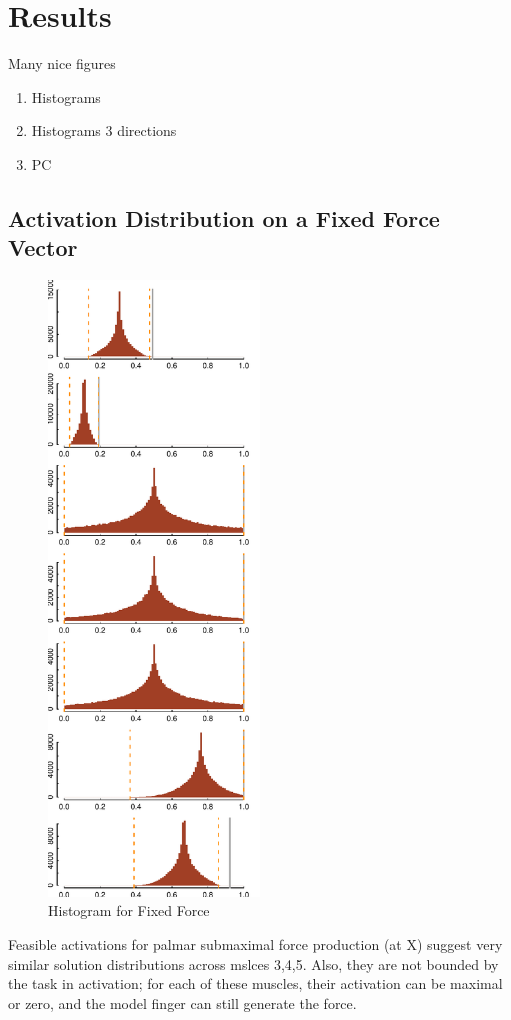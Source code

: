 \section{Results}
Many nice figures
\begin{enumerate}
	\item Histograms
	\item Histograms 3 directions
	\item PC
\end{enumerate}

\subsection{Activation Distribution on a  Fixed Force Vector}

\begin{figure}[ht]
   \begin{center}
    \includegraphics[width=0.5\textwidth]{figs/raw_histograms.pdf}
  \end{center}
  \caption{Histogram for Fixed Force}
  \label{fig_rawhisto}
\end{figure}
Feasible activations for palmar submaximal force production (at X\percent) suggest very similar solution distributions across mslces 3,4,5. Also, they are not bounded by the task in activation; for each of these muscles, their activation can be maximal or zero, and the model finger can still generate the force.

